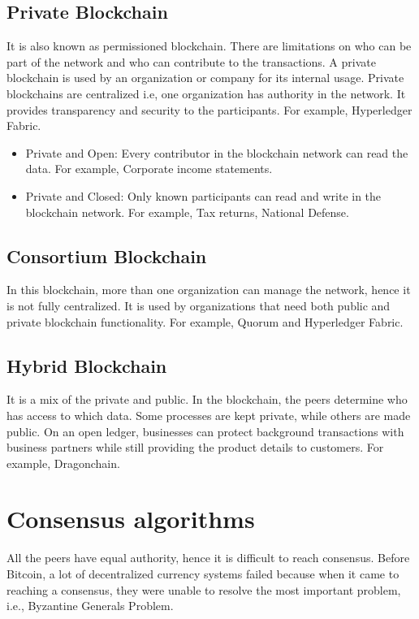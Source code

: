 \subsection{Private Blockchain}
It is also known as permissioned blockchain. There are limitations on who can be part of the network and who can contribute to the transactions. A private blockchain is used by an organization or company for its internal usage. Private blockchains are centralized i.e, one organization has authority in the network. It provides transparency and security to the participants.
For example, Hyperledger Fabric.

\begin{itemize}
    \item Private and Open: Every contributor in the blockchain network can read the data. For example, Corporate income statements.
    
    \item Private and Closed: Only known participants can read and write in the blockchain network. For example, Tax returns, National Defense.
\end{itemize}

\subsection{Consortium Blockchain}
In this blockchain, more than one organization can manage the network, hence it is not fully centralized. It is used by organizations that need both public and private blockchain functionality. For example, Quorum and Hyperledger Fabric.


\subsection{Hybrid Blockchain}
 It is a mix of the private and public. In the blockchain, the peers determine who has access to which data. Some processes are kept private, while others are made public. On an open ledger, businesses can protect background transactions with business partners while still providing the product details to customers. For example, Dragonchain.

\section{Consensus algorithms}
All the peers have equal authority, hence it is difficult to reach consensus. Before Bitcoin, a lot of decentralized currency systems failed because when it came to reaching a consensus, they were unable to resolve the most important problem, i.e., Byzantine Generals Problem.\cite{blockchain}

